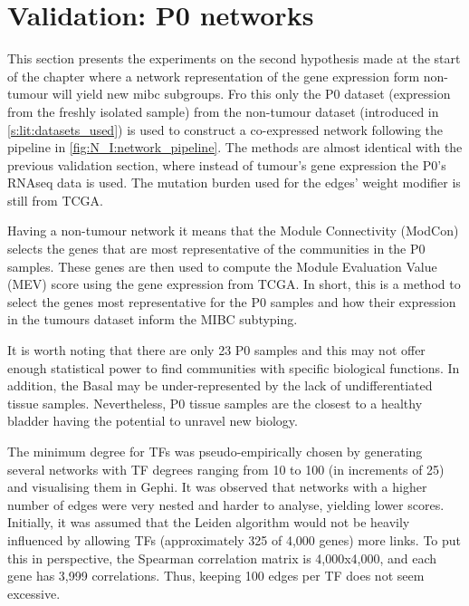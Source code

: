 \section{Validation: P0 networks} \label{s:p0}

This section presents the experiments on the second hypothesis made at the start of the chapter where a network representation of the gene expression form non-tumour will yield new \acrlong{mibc} subgroups. Fro this only the P0 dataset (expression from the freshly isolated sample) from the non-tumour dataset (introduced in \cref{s:lit:datasets_used}) is used to construct a co-expressed network following the pipeline in \cref{fig:N_I:network_pipeline}. The methods are almost identical with the previous validation section, where instead of tumour's gene expression the P0's RNAseq data is used. The mutation burden used for the edges' weight modifier is still from TCGA. 

Having a non-tumour network it means that the Module Connectivity (ModCon) selects the genes that are most representative of the communities in the P0 samples. These genes are then used to compute the Module Evaluation Value (MEV) score using the gene expression from TCGA. In short, this is a method to select the genes most representative for the P0 samples and how their expression in the tumours dataset inform the MIBC subtyping.

It is worth noting that there are only 23 P0 samples and this may not offer enough statistical power to find communities with specific biological functions. In addition, the Basal may be under-represented by the lack of undifferentiated tissue samples. Nevertheless, P0 tissue samples are the closest to a healthy bladder having the potential to unravel new biology.

The minimum degree for TFs was pseudo-empirically chosen by generating several networks with TF degrees ranging from 10 to 100 (in increments of 25) and visualising them in Gephi. It was observed that networks with a higher number of edges were very nested and harder to analyse, yielding lower scores. Initially, it was assumed that the Leiden algorithm would not be heavily influenced by allowing TFs (approximately 325 of 4,000 genes) more links. To put this in perspective, the Spearman correlation matrix is 4,000x4,000, and each gene has 3,999 correlations. Thus, keeping 100 edges per TF does not seem excessive.

